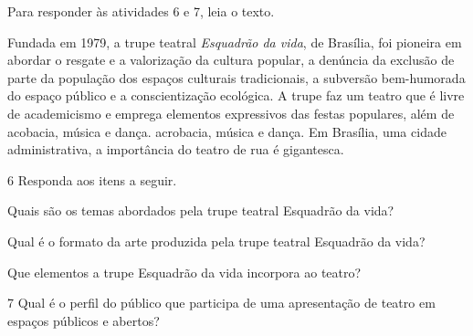 

\pagebreak
Para responder às atividades 6 e 7, leia o texto.

\begin{myquote}
Fundada em 1979, a trupe teatral \emph{Esquadrão da vida}, de Brasília,
foi pioneira em abordar o resgate e a valorização da cultura popular, a
denúncia da exclusão de parte da população dos espaços culturais tradicionais,
a subversão bem-humorada do espaço público e a conscientização ecológica.
A trupe faz um teatro que é livre de academicismo e emprega elementos
expressivos das festas populares, além de acobacia, música e dança.
acrobacia, música e dança. Em Brasília, uma cidade administrativa,
a importância do teatro de rua é gigantesca.

\end{myquote}

\num{6}  Responda aos itens a seguir.

\begin{escolha}
\item Quais são os temas abordados pela trupe teatral Esquadrão da vida?\\

\item Qual é o formato da arte produzida pela trupe teatral Esquadrão da vida?\\

\item Que elementos a trupe Esquadrão da vida incorpora ao teatro?\\
\end{escolha}

\num{7} Qual é o perfil do público que participa de uma apresentação de teatro em espaços públicos e abertos?

